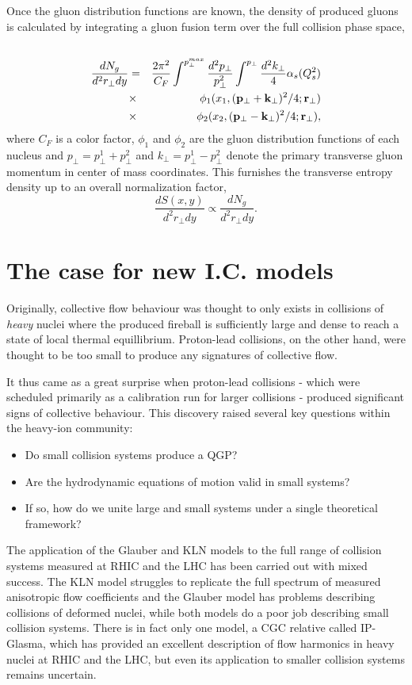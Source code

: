 \documentclass[aps,prc,reprint,amsmath,nofootinbib]{revtex4-1}
\begin{document}
Once the gluon distribution functions are known, the density of produced gluons is calculated by integrating a gluon fusion term over the full collision phase space,
\begin{eqnarray}
 \cr \frac{dN_g}{d^2r_\perp dy} &=& \frac{2 \pi^2}{C_F} \int^{p_\perp^{max}} \frac{d^2 p_\perp}{p_\perp^2} \int^{p_\perp} \frac{d^2 k_\perp}{4} \alpha_s(Q_s^2) \\
 &\times& \phi_1(x_1,({\bf p}_\perp + {\bf k}_\perp)^2/4; {\bf r}_\perp) \\
 &\times& \phi_2(x_2,({\bf p}_\perp - {\bf k}_\perp)^2/4; {\bf r}_\perp),
\end{eqnarray}
where $C_F$ is a color factor, $\phi_1$ and $\phi_2$ are the gluon distribution functions of each nucleus and $p_\perp = p_\perp^1 + p_\perp^2$ and 
$k_\perp = p_\perp^1 - p_\perp^2$ denote the primary transverse gluon momentum in center of mass coordinates. This furnishes the transverse entropy density up to an 
overall normalization factor,
\begin{equation}
 \frac{dS(x,y)}{d^2r_\perp dy} \propto \frac{dN_g}{d^2r_\perp dy}.
\end{equation}

\section{The case for new I.C. models}

Originally, collective flow behaviour was thought to only exists in collisions of \emph{heavy} nuclei where the produced fireball is sufficiently large and dense to reach 
a state of local thermal equillibrium. Proton-lead collisions, on the other hand, were thought to be too small to produce any signatures of collective flow.

It thus came as a great surprise when proton-lead collisions - which were scheduled primarily as a calibration run for larger collisions - produced significant signs of 
collective behaviour. This discovery raised several key questions within the heavy-ion community:
\begin{itemize}
 \item Do small collision systems produce a QGP? 
 \item Are the hydrodynamic equations of motion valid in small systems?
 \item If so, how do we unite large and small systems under a single theoretical framework?
\end{itemize}

The application of the Glauber and KLN models to the full range of collision systems measured at RHIC and the LHC has been carried out with mixed success. The KLN model
struggles to replicate the full spectrum of measured anisotropic flow coefficients and the Glauber model has problems describing collisions of deformed nuclei, while 
both models do a poor job describing small collision systems. There is in fact only one model, a CGC relative called IP-Glasma, which has provided an excellent 
description of flow harmonics in heavy nuclei at RHIC and the LHC, but even its application to smaller collision systems remains uncertain.
\end{document}
